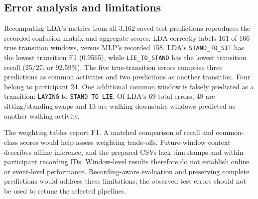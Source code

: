 \subsection{Error analysis and limitations}
Recomputing LDA's metrics from all 3,162 saved test predictions reproduces
the recorded confusion matrix and aggregate scores. LDA correctly labels
161 of 166 true transition windows, versus MLP's recorded 158. LDA's
\texttt{STAND\_TO\_SIT} has the lowest transition F1 (0.9565), while
\texttt{LIE\_TO\_STAND} has the lowest transition recall (25/27, or 92.59\%).
The five true-transition errors comprise three predictions as common activities
and two predictions as another transition. Four belong to participant 24.
One additional common window is falsely predicted as a transition:
\texttt{LAYING} to \texttt{STAND\_TO\_LIE}.
Of LDA's 69 total errors, 48 are sitting/standing swaps and 13 are
walking-downstairs windows predicted as another walking activity.

The weighting tables report F1. A matched comparison of recall and
common-class scores would help assess weighting trade-offs. Future-window context describes
offline inference, and the prepared CSVs lack timestamps and within-participant
recording IDs. Window-level results
therefore do not establish online or event-level performance. Recording-aware
evaluation and preserving complete predictions would address these limitations;
the observed test errors should not be used to retune the selected pipelines.
